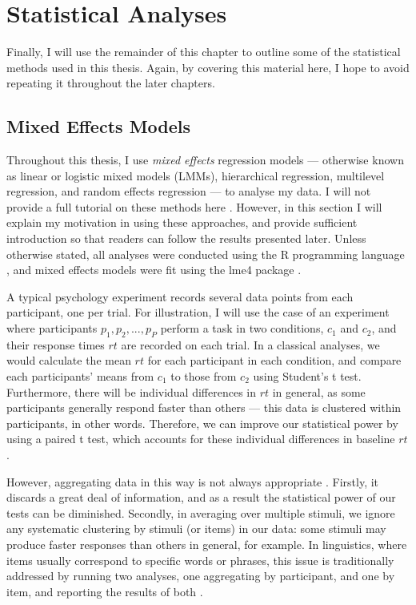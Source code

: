 
\section{Statistical Analyses}\label{sec:statistics}

Finally, I will use the remainder of this chapter
to outline some of the statistical methods used in this thesis.
Again, by covering this material here,
I hope to avoid repeating it throughout the later chapters.

\subsection{Mixed Effects Models}\label{subsec:statistics-lme}

Throughout this thesis, I use \emph{mixed effects} regression models
\citep{Gelman2007, Baayen2008}
--- otherwise known as linear or logistic mixed models (LMMs), hierarchical regression,
multilevel regression, and random effects regression ---
to analyse my data.
I will not provide a full tutorial on these methods here
\citep[see instead][]{Gelman2007, Baayen2008,Quene2008,Bates2015a}.
However, in this section I will explain my motivation in using these approaches,
and provide sufficient introduction so that readers
can follow the results presented later.
Unless otherwise stated, all analyses were conducted
using the R programming language \citep{RCoreTeam2015},
and mixed effects models were fit using the lme4 package \citep{Bates2015a}.

A typical psychology experiment records
several data points from each participant, one per trial.
For illustration, I will use the case of an experiment where
participants $p_1, p_2, ..., p_P$  perform a task in two conditions, $c_1$ and $c_2$,
and their response times $rt$ are recorded on each trial.
In a classical analyses, we would calculate the mean $rt$
for each participant in each condition,
and compare each participants' means from $c_1$
to those from $c_2$ using Student's t test.
Furthermore, there will be individual differences in $rt$ in general,
as some participants generally respond faster than others ---
this data is clustered within participants, in other words.
Therefore, we can improve our statistical power
by using a paired t test,
which accounts for these individual differences in baseline $rt$.

However, aggregating data in this way is not always appropriate
\citep[see][]{Baayen2008}.
Firstly, it discards a great deal of information,
and as a result the statistical power of our tests can be diminished.
Secondly, in averaging over multiple stimuli,
we ignore any systematic clustering by stimuli (or items) in our data:
some stimuli may produce faster responses than others in general, for example.
In linguistics, where items usually correspond to specific words or phrases,
this issue is traditionally addressed by running two analyses,
one aggregating by participant, and one by item,
and reporting the results of both \citep{Clark1973}.

